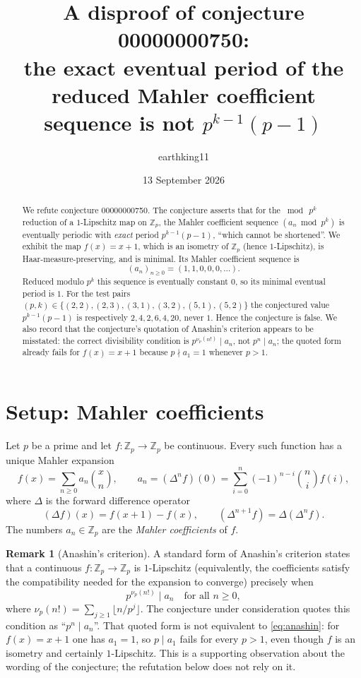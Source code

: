 \documentclass[11pt]{article}
\title{A disproof of conjecture 00000000750:\\
the exact eventual period of the reduced Mahler coefficient\\
sequence is not $p^{k-1}(p-1)$}
\author{earthking11}
\date{13 September 2026}
\theoremstyle{definition}
\newtheorem{remark}[theorem]{Remark}
\newcommand{\Zp}{\mathbb{Z}_p}
\newcommand{\D}{\Delta}
\newcommand{\vpp}{\nu_p}
\begin{document}
\maketitle

\begin{abstract}
We refute conjecture 00000000750. The conjecture asserts that for the
$\bmod\,p^k$ reduction of a $1$-Lipschitz map on $\Zp$, the Mahler coefficient
sequence $(a_n \bmod p^k)$ is eventually periodic with \emph{exact} period
$p^{k-1}(p-1)$, ``which cannot be shortened''. We exhibit the map
$f(x)=x+1$, which is an isometry of $\Zp$ (hence $1$-Lipschitz), is
Haar-measure-preserving, and is minimal. Its Mahler coefficient sequence is
\[
(a_n)_{n\ge 0} = (1,1,0,0,0,\dots).
\]
Reduced modulo $p^k$ this sequence is eventually constant $0$, so its minimal
eventual period is $1$. For the test pairs $(p,k) \in \{(2,2),(2,3),(3,1),
(3,2),(5,1),(5,2)\}$ the conjectured value $p^{k-1}(p-1)$ is respectively
$2,4,2,6,4,20$, never $1$. Hence the conjecture is false. We also record that
the conjecture's quotation of Anashin's criterion appears to be misstated: the
correct divisibility condition is $p^{\vpp(n!)} \mid a_n$, not
$p^n \mid a_n$; the quoted form already fails for $f(x)=x+1$ because
$p \nmid a_1 = 1$ whenever $p>1$.
\end{abstract}

\section{Setup: Mahler coefficients}

Let $p$ be a prime and let $f:\Zp \to \Zp$ be continuous. Every such function
has a unique Mahler expansion
\begin{equation}\label{eq:mahler}
  f(x) = \sum_{n\ge 0} a_n \binom{x}{n},
  \qquad
  a_n = (\D^n f)(0) = \sum_{i=0}^{n} (-1)^{n-i}\binom{n}{i} f(i),
\end{equation}
where $\D$ is the forward difference operator
\[
  (\D f)(x) = f(x+1) - f(x),
  \qquad
  (\D^{n+1} f) = \D(\D^n f).
\]
The numbers $a_n \in \Zp$ are the \emph{Mahler coefficients} of $f$.

\begin{remark}[Anashin's criterion]\label{rem:anashin}
A standard form of Anashin's criterion states that a continuous
$f:\Zp\to\Zp$ is $1$-Lipschitz (equivalently, the coefficients satisfy the
compatibility needed for the expansion to converge) precisely when
\begin{equation}\label{eq:anashin}
  p^{\vpp(n!)} \mid a_n \quad \text{for all } n \ge 0,
\end{equation}
where $\vpp(n!) = \sum_{j\ge 1}\lfloor n/p^j\rfloor$. The conjecture under
consideration quotes this condition as ``$p^n \mid a_n$''. That quoted form is
not equivalent to \eqref{eq:anashin}: for $f(x)=x+1$ one has $a_1 = 1$, so
$p \mid a_1$ fails for every $p>1$, even though $f$ is an isometry and
certainly $1$-Lipschitz. This is a supporting observation about the wording of
the conjecture; the refutation below does not rely on it.
\end{remark}
\end{document}
